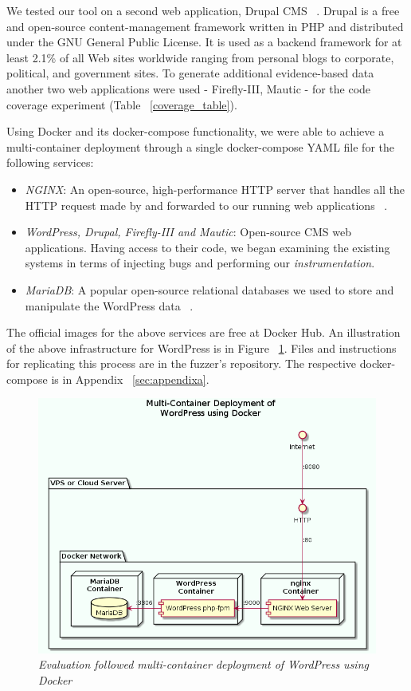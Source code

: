We tested our tool on a second web application, Drupal CMS ~\cite{drupal}. Drupal is a free and open-source content-management framework written in PHP and distributed under the GNU General Public License. It is used as a backend framework for at least 2.1\% of all Web sites worldwide ranging from personal blogs to corporate, political, and government sites. To generate additional evidence-based data another two web applications were used - Firefly-III, Mautic - for the code coverage experiment (Table ~\ref{coverage_table}).

Using Docker and its docker-compose functionality, we were able to achieve a multi-container deployment through a single docker-compose YAML file for the following services:

\begin{itemize}
	\item \emph{NGINX}: An open-source, high-performance HTTP server that handles all the HTTP request made by \pname{} and forwarded to our running web applications {~\cite{nginx}}.
	\item \emph{WordPress, Drupal, Firefly-III and Mautic}: Open-source CMS web applications. Having access to their code, we began examining the existing systems in terms of injecting bugs and performing our \emph{instrumentation}.
	\item \emph{MariaDB}: A popular open-source relational databases we used to store and manipulate the WordPress data ~\cite{mariadb}.
\end{itemize}

The official images for the above services are free at Docker Hub. An illustration of the above infrastructure for WordPress is in Figure ~\ref{fig:multi-container}. Files and instructions for replicating this process are in the fuzzer's repository. The respective docker-compose is in Appendix ~\ref{sec:appendixa}.

\begin{figure}[ht]
 \centering
 \captionsetup{justification=centering}
 \includegraphics[width=\linewidth]{figures/multi-container.png}
 \caption[Multi-container deployment of WordPress using Docker]{\textit{Evaluation followed multi-container deployment of WordPress using Docker}}
 \label{fig:multi-container}
\end{figure}

